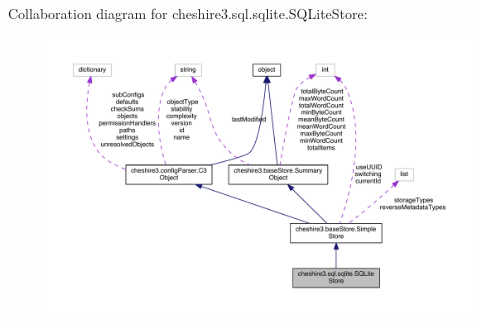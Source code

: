 Collaboration diagram for cheshire3.\-sql.\-sqlite.\-S\-Q\-Lite\-Store\-:
\nopagebreak
\begin{figure}[H]
\begin{center}
\leavevmode
\includegraphics[width=350pt]{classcheshire3_1_1sql_1_1sqlite_1_1_s_q_lite_store__coll__graph}
\end{center}
\end{figure}
